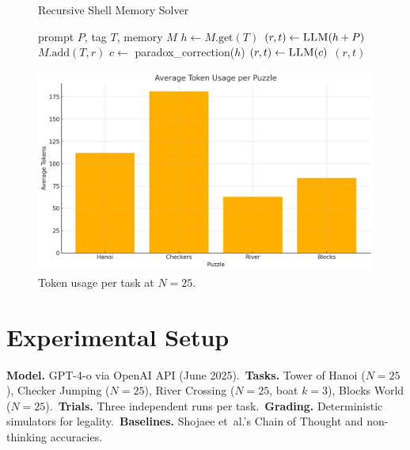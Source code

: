 \documentclass[11pt]{article}
\begin{document}
\begin{figure}[t]
\begin{minipage}{.55\linewidth}
\begin{algorithm}[H]
\footnotesize
\caption{Recursive Shell Memory Solver}\label{alg:shell}
\begin{algorithmic}[1]
\Require prompt $P$, tag $T$, memory $M$
\State $h \gets M.\text{get}(T)$
\State $(r,t) \gets \textsc{LLM}(h+P)$
\State $M.\text{add}(T,r)$
  \State $c \gets$ paradox\_correction($h$)
  \State $(r,t) \gets \textsc{LLM}(c)$
\EndIf
\State \Return $(r,t)$
\end{algorithmic}
\end{algorithm}
\end{minipage}\hfill
\begin{minipage}{.4\linewidth}
\centering
\includegraphics[width=\linewidth]{images/token_chart.png}
\caption{Token usage per task at $N=25$.}
\label{fig:tokens}
\end{minipage}
\end{figure}

\section{Experimental Setup}

\textbf{Model.} GPT-4-o via OpenAI API (June 2025).\
\textbf{Tasks.} Tower of Hanoi ($N=25$), Checker Jumping ($N=25$), River
Crossing ($N=25$, boat $k=3$), Blocks World ($N=25$).\
\textbf{Trials.} Three independent runs per task.\
\textbf{Grading.} Deterministic simulators for legality.\
\textbf{Baselines.} Shojaee et~al.’s Chain of Thought and non-thinking
accuracies.
\end{document}
